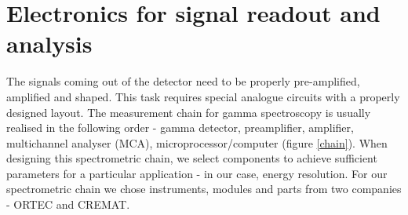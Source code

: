 
\chapter{Electronics for signal readout and analysis}
The signals coming out of the detector need to be properly pre-amplified, amplified and shaped. This task requires special analogue circuits with a properly designed layout. 
The measurement chain for gamma spectroscopy is usually realised in the following order - gamma detector, preamplifier, amplifier, multichannel analyser (MCA), microprocessor/computer (figure \ref{chain}). When designing this spectrometric chain, we select components to achieve sufficient parameters for a particular application - in our case, energy resolution. For our spectrometric chain we chose instruments, modules and parts from two companies - ORTEC and CREMAT.

